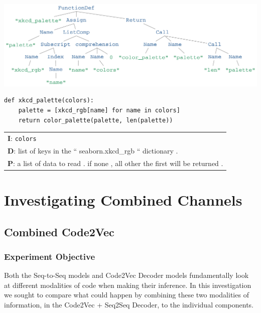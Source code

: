 \begin{listing}[h!] 
\begin{center}

\includegraphics[width=\linewidth]{ImagesCodeRelated/xkcd_palette_strip.png}
\begin{verbatim}
def xkcd_palette(colors):
    palette = [xkcd_rgb[name] for name in colors]
    return color_palette(palette, len(palette))

\end{verbatim}
\begin{tabular}{l}
\textbf{I}: \texttt{colors}\\
\textbf{D}: list of keys in the `` seaborn.xkcd\_rgb `` dictionary .\\
\textbf{P}: a list of data to read . if none , all other the first will be returned .\\
\end{tabular}
\end{center}
\end{listing}







\section{Investigating Combined Channels} %
\label{sec:investigating_combined_channels}


\subsection{Combined Code2Vec } %
\label{sub:combined_code2vec}


\subsubsection{Experiment Objective} %

Both the Seq-to-Seq models and Code2Vec Decoder models fundamentally look at different modalities of code when making their inference.
In this investigation we sought to compare what could happen by combining these two modalities of information, in the Code2Vec + Seq2Seq Decoder, to the individual components.

